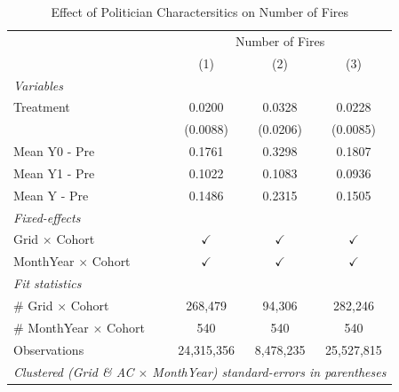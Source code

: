 
\begin{table}[htbp]
   \caption{\label{tab:protest_treat_main} Effect of Politician Charactersitics on Number of Fires}
   \centering
   \begin{tabular}{lccc}
      \tabularnewline \midrule \midrule
       & \multicolumn{3}{c}{Number of Fires}\\
                                     & (1)           & (2)           & (3)\\  
      \midrule
      \emph{Variables}\\
      Treatment                      & 0.0200        & 0.0328        & 0.0228\\   
                                     & (0.0088)      & (0.0206)      & (0.0085)\\   
      \hline Mean Y0 - Pre           & 0.1761        & 0.3298        & 0.1807\\  
      Mean Y1 - Pre                  & 0.1022        & 0.1083        & 0.0936\\  
      Mean Y - Pre                   & 0.1486        & 0.2315        & 0.1505\\  
      \midrule
      \emph{Fixed-effects}\\
      Grid $\times$ Cohort           & $\checkmark$  & $\checkmark$  & $\checkmark$\\   
      MonthYear $\times$ Cohort      & $\checkmark$  & $\checkmark$  & $\checkmark$\\   
      \midrule
      \emph{Fit statistics}\\
      \# Grid $\times$ Cohort        & 268,479       & 94,306        & 282,246\\  
      \# MonthYear $\times$ Cohort   & 540           & 540           & 540\\  
      Observations                   & 24,315,356    & 8,478,235     & 25,527,815\\  
      \midrule \midrule
      \multicolumn{4}{l}{\emph{Clustered (Grid \& AC $\times$ MonthYear) standard-errors in parentheses}}\\
   \end{tabular}
\end{table}


